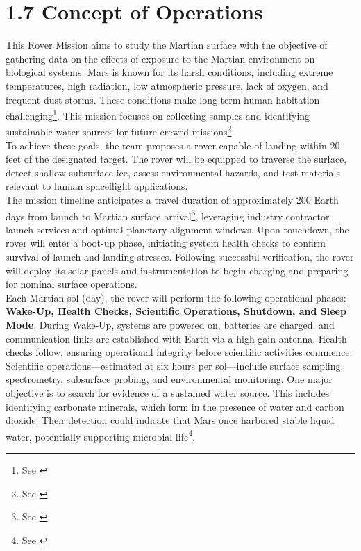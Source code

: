 \section*{1.7 Concept of Operations}

This Rover Mission aims to study the Martian surface with the objective of gathering data on the effects of exposure to the Martian environment on biological systems. Mars is known for its harsh conditions, including extreme temperatures, high radiation, low atmospheric pressure, lack of oxygen, and frequent dust storms. These conditions make long-term human habitation challenging\footnote{See \cite{nasa_mars_goals}}. This mission focuses on collecting samples and identifying sustainable water sources for future crewed missions\footnote{See \cite{nasa_m2m_objectives}}.\\

To achieve these goals, the team proposes a rover capable of landing within 20 feet of the designated target. The rover will be equipped to traverse the surface, detect shallow subsurface ice, assess environmental hazards, and test materials relevant to human spaceflight applications.\\

The mission timeline anticipates a travel duration of approximately 200 Earth days from launch to Martian surface arrival\footnote{See \cite{nasa_how_long_mars}}, leveraging industry contractor launch services and optimal planetary alignment windows. Upon touchdown, the rover will enter a boot-up phase, initiating system health checks to confirm survival of launch and landing stresses. Following successful verification, the rover will deploy its solar panels and instrumentation to begin charging and preparing for nominal surface operations.\\

Each Martian sol (day), the rover will perform the following operational phases: \textbf{Wake-Up, Health Checks, Scientific Operations, Shutdown, and Sleep Mode}. During Wake-Up, systems are powered on, batteries are charged, and communication links are established with Earth via a high-gain antenna. Health checks follow, ensuring operational integrity before scientific activities commence.\\

Scientific operations—estimated at six hours per sol—include surface sampling, spectrometry, subsurface probing, and environmental monitoring. One major objective is to search for evidence of a sustained water source. This includes identifying carbonate minerals, which form in the presence of water and carbon dioxide. Their detection could indicate that Mars once harbored stable liquid water, potentially supporting microbial life\footnote{See \cite{nasa_mars_goals}}.\\


